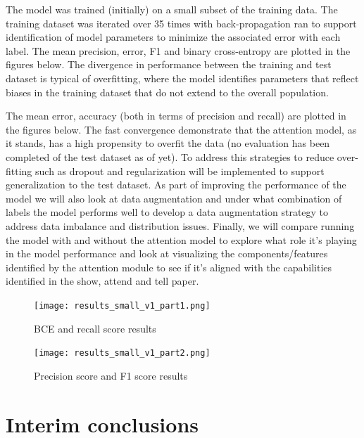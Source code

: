 \documentclass{article}
\begin{document}
The model was trained (initially) on a small subset of the training data. The training dataset was iterated over 35 times with back-propagation ran to support identification of model parameters to minimize the associated error with each label. 
\newline
\newline
The mean precision, error, F1 and binary cross-entropy are plotted in the figures below. The divergence in performance between the training and test dataset is typical of overfitting, where the model identifies parameters that reflect biases in the training dataset that do not extend to the overall population. 

\newline
\newline
The mean error, accuracy (both in terms of precision and recall) are plotted in the figures below. The fast convergence demonstrate that the attention model, as it stands, has a high propensity to overfit the data (no evaluation has been completed of the test dataset as of yet). To address this strategies to reduce over-fitting such as dropout and regularization will be implemented to support generalization to the test dataset. As part of improving the performance of the model we will also look at data augmentation and under what combination of labels the model performs well to develop a data augmentation strategy to address data imbalance and distribution issues. Finally, we will compare running the model with and without the attention model to explore what role it's playing in the model performance and look at visualizing the components/features identified by the attention module to see if it's aligned with the capabilities identified in the show, attend and tell paper. 

\begin{figure} [ht]
    \centering
    \texttt{[image: results\_small\_v1\_part1.png]}
    \caption{BCE and recall score results}
    \label{fig:results1}
\end{figure}
\begin{figure} [ht]
    \centering
    \texttt{[image: results\_small\_v1\_part2.png]}
    \caption{Precision score and F1 score results}
    \label{fig:results2}
\end{figure}


\section{Interim conclusions}
\label{sec:concl}
\end{document}
